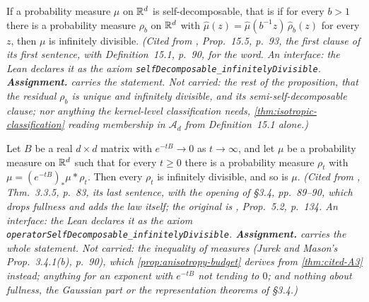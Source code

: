\begin{theorem}
\label{thm:cited-A4}
\leanok
If a probability measure $\mu$ on $\mathbb{R}^d$ is self-decomposable, that is if for every $b > 1$ there
is a probability measure $\rho_b$ on $\mathbb{R}^d$ with
$\widehat\mu(z) = \widehat\mu(b^{-1}z)\,\widehat\rho_b(z)$ for every $z$, then $\mu$ is
infinitely divisible.
\statusA\quad{}\quad\emph{(Cited from , Prop.~15.5, p.~93, the
first clause of its first sentence, with Definition~15.1, p.~90, for the word. An interface: the
Lean declares it as the axiom \texttt{selfDecomposable\_infinitelyDivisible}. \textbf{Assignment.}
 carries the statement. Not carried: the rest of the proposition, that the residual
$\rho_b$ is unique and infinitely divisible, and its semi-self-decomposable clause; nor anything
the kernel-level classification needs, \ref{thm:isotropic-classification} reading membership in
$\mathcal{A}_d$ from Definition~15.1 alone.)}
\end{theorem}

\begin{theorem}
\label{thm:cited-A5}
\leanok
Let $B$ be a real $d \times d$ matrix with $e^{-tB} \to 0$ as $t \to \infty$, and let $\mu$ be a
probability measure on $\mathbb{R}^d$ such that for every $t \ge 0$ there is a probability measure
$\rho_t$ with $\mu = (e^{-tB})_*\mu * \rho_t$. Then every $\rho_t$ is infinitely divisible, and so
is $\mu$.
\statusA\quad{}\quad\emph{(Cited from , Thm.~3.3.5, p.~83,
its last sentence, with the opening of \S 3.4, pp.~89--90, which drops fullness and adds the law
itself; the original is , Prop.~5.2, p.~134. An interface: the Lean
declares it as the axiom \texttt{operatorSelfDecomposable\_infinitelyDivisible}.
\textbf{Assignment.}  carries the whole statement. Not carried: the inequality of
\Levy{} measures (Jurek and Mason's Prop.~3.4.1(b), p.~90), which
\ref{prop:anisotropy-budget} derives from \ref{thm:cited-A3} instead; anything for an exponent
with $e^{-tB}$ not tending to $0$; and nothing about fullness, the Gaussian part or the
representation theorems of \S 3.4.)}
\end{theorem}

